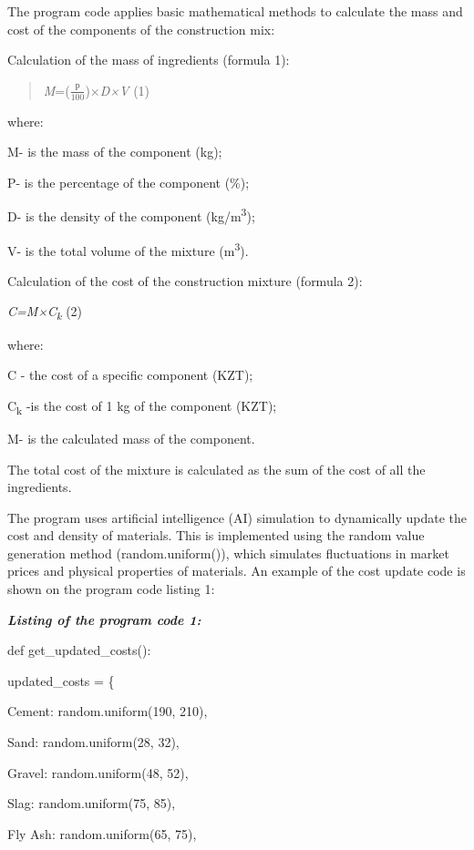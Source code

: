 \documentclass[
]{article}
\begin{document}
The program code applies basic mathematical methods to calculate the
mass and cost of the components of the construction mix:

Calculation of the mass of ingredients (formula 1):

\begin{quote}
\emph{M}=(\(\frac{Р}{100}\))×\emph{D×V} (1)
\end{quote}

where:

M- is the mass of the component (kg);

P- is the percentage of the component (\%);

D- is the density of the component (kg/m\textsuperscript{3});

V- is the total volume of the mixture (m\textsuperscript{3}).

Calculation of the cost of the construction mixture (formula 2):

\emph{C=M×C\textsubscript{k}} (2)

where:

C - the cost of a specific component (KZT);

C\textsubscript{k} -is the cost of 1 kg of the component (KZT);

M- is the calculated mass of the component.

The total cost of the mixture is calculated as the sum of the cost of
all the ingredients.

The program uses artificial intelligence (AI) simulation to dynamically
update the cost and density of materials. This is implemented using the
random value generation method (random.uniform()), which simulates
fluctuations in market prices and physical properties of materials. An
example of the cost update code is shown on the program code listing 1:

\emph{\textbf{Listing of the program code 1:}}

def get\_updated\_costs():

updated\_costs = \{

\textquotesingle Cement\textquotesingle: random.uniform(190, 210),

\textquotesingle Sand\textquotesingle: random.uniform(28, 32),

\textquotesingle Gravel\textquotesingle: random.uniform(48, 52),

\textquotesingle Slag\textquotesingle: random.uniform(75, 85),

\textquotesingle Fly Ash\textquotesingle: random.uniform(65, 75),
\end{document}
